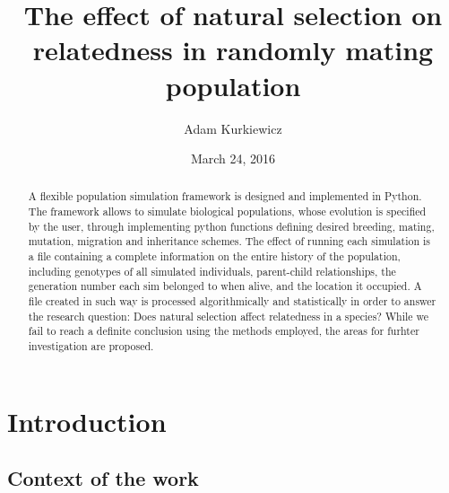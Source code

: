 \documentclass{l4proj}
\newif\ifdebug
\begin{document}
\title{The effect of natural selection on relatedness in randomly mating population}
\author{Adam Kurkiewicz}
\date{March 24, 2016}
\maketitle

\begin{abstract}

A flexible population simulation framework is designed and implemented in Python. The framework allows to simulate biological populations, whose evolution is specified by the user, through implementing python functions defining desired breeding, mating, mutation, migration and inheritance schemes. The effect of running each simulation is a file containing a complete information on the entire history of the population, including genotypes of all simulated individuals, parent-child relationships, the generation number each sim belonged to when alive, and the location it occupied. A file created in such way is processed algorithmically and statistically in order to answer the research question: Does natural selection affect relatedness in a species? While we fail to reach a definite conclusion using the methods employed, the areas for furhter investigation are proposed.

\end{abstract}

\educationalconsent

\tableofcontents
\chapter{Introduction}
\label{intro}

\ifdebug
  Introduction. This should place the work in context and will be developed from the introduction produced for assessment.
\fi


\section{Context of the work}
\end{document}
